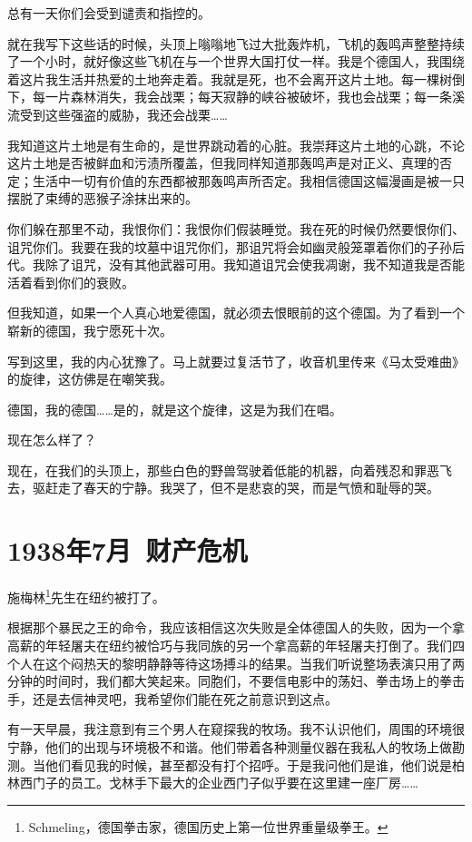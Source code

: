 \documentclass[UTF8]{ctexart}
\begin{document}
总有一天你们会受到谴责和指控的。

就在我写下这些话的时候，头顶上嗡嗡地飞过大批轰炸机，飞机的轰鸣声整整持续了一个小时，就好像这些飞机在与一个世界大国打仗一样。我是个德国人，我围绕着这片我生活并热爱的土地奔走着。我就是死，也不会离开这片土地。每一棵树倒下，每一片森林消失，我会战栗；每天寂静的峡谷被破坏，我也会战栗；每一条溪流受到这些强盗的威胁，我还会战栗……

我知道这片土地是有生命的，是世界跳动着的心脏。我崇拜这片土地的心跳，不论这片土地是否被鲜血和污渍所覆盖，但我同样知道那轰鸣声是对正义、真理的否定；生活中一切有价值的东西都被那轰鸣声所否定。我相信德国这幅漫画是被一只摆脱了束缚的恶猴子涂抹出来的。

你们躲在那里不动，我恨你们：我恨你们假装睡觉。我在死的时候仍然要恨你们、诅咒你们。我要在我的坟墓中诅咒你们，那诅咒将会如幽灵般笼罩着你们的子孙后代。我除了诅咒，没有其他武器可用。我知道诅咒会使我凋谢，我不知道我是否能活着看到你们的衰败。

但我知道，如果一个人真心地爱德国，就必须去恨眼前的这个德国。为了看到一个崭新的德国，我宁愿死十次。

写到这里，我的内心犹豫了。马上就要过复活节了，收音机里传来《马太受难曲》的旋律，这仿佛是在嘲笑我。

德国，我的德国……是的，就是这个旋律，这是为我们在唱。

现在怎么样了？

现在，在我们的头顶上，那些白色的野兽驾驶着低能的机器，向着残忍和罪恶飞去，驱赶走了春天的宁静。我哭了，但不是悲哀的哭，而是气愤和耻辱的哭。

\section{1938年7月\ 财产危机}

施梅林\footnote{Schmeling，德国拳击家，德国历史上第一位世界重量级拳王。}先生在纽约被打了。

根据那个暴民之王的命令，我应该相信这次失败是全体德国人的失败，因为一个拿高薪的年轻屠夫在纽约被恰巧与我同族的另一个拿高薪的年轻屠夫打倒了。我们四个人在这个闷热天的黎明静静等待这场搏斗的结果。当我们听说整场表演只用了两分钟的时间时，我们都大笑起来。同胞们，不要信电影中的荡妇、拳击场上的拳击手，还是去信神灵吧，我希望你们能在死之前意识到这点。

有一天早晨，我注意到有三个男人在窥探我的牧场。我不认识他们，周围的环境很宁静，他们的出现与环境极不和谐。他们带着各种测量仪器在我私人的牧场上做勘测。当他们看见我的时候，甚至都没有打个招呼。于是我问他们是谁，他们说是柏林西门子的员工。戈林手下最大的企业西门子似乎要在这里建一座厂房……
\end{document}
